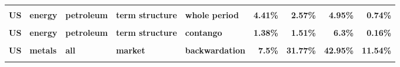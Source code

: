 \documentclass[
  authoryear,
  preprint,
  3p]{elsarticle}
\begin{document}
\begin{landscape}
\begin{longtable}[t]{>{}l>{}l>{}l>{}l>{}l>{}r>{}r>{}r>{}r}
\textbf{\cellcolor{gray!10}{US}} & \textbf{\cellcolor{gray!10}{energy}} & \textbf{\cellcolor{gray!10}{petroleum}} & \textbf{\cellcolor{gray!10}{open interest nearby}} & \textbf{\cellcolor{gray!10}{contango}} & \textcolor[HTML]{4285f4}{\textbf{\cellcolor{gray!10}{47.85\%}}} & \textcolor[HTML]{4285f4}{\textbf{\cellcolor{gray!10}{43.02\%}}} & \textcolor[HTML]{4285f4}{\textbf{\cellcolor{gray!10}{26.44\%}}} & \textcolor[HTML]{4285f4}{\textbf{\cellcolor{gray!10}{37.7\%}}}\\
\addlinespace
\textbf{US} & \textbf{energy} & \textbf{petroleum} & \textbf{term structure} & \textbf{whole period} & \textcolor[HTML]{4285f4}{\textbf{4.41\%}} & \textcolor[HTML]{4285f4}{\textbf{2.57\%}} & \textcolor[HTML]{4285f4}{\textbf{4.95\%}} & \textcolor[HTML]{4285f4}{\textbf{0.74\%}}\\
\textbf{\cellcolor{gray!10}{US}} & \textbf{\cellcolor{gray!10}{energy}} & \textbf{\cellcolor{gray!10}{petroleum}} & \textbf{\cellcolor{gray!10}{term structure}} & \textbf{\cellcolor{gray!10}{backwardation}} & \textcolor[HTML]{4285f4}{\textbf{\cellcolor{gray!10}{9.74\%}}} & \textcolor[HTML]{4285f4}{\textbf{\cellcolor{gray!10}{4.32\%}}} & \textcolor[HTML]{4285f4}{\textbf{\cellcolor{gray!10}{2.68\%}}} & \textcolor[HTML]{4285f4}{\textbf{\cellcolor{gray!10}{2.56\%}}}\\
\textbf{US} & \textbf{energy} & \textbf{petroleum} & \textbf{term structure} & \textbf{contango} & \textcolor[HTML]{4285f4}{\textbf{1.38\%}} & \textcolor[HTML]{4285f4}{\textbf{1.51\%}} & \textcolor[HTML]{4285f4}{\textbf{6.3\%}} & \textcolor[HTML]{4285f4}{\textbf{0.16\%}}\\
\textbf{\cellcolor{gray!10}{US}} & \textbf{\cellcolor{gray!10}{metals}} & \textbf{\cellcolor{gray!10}{all}} & \textbf{\cellcolor{gray!10}{market}} & \textbf{\cellcolor{gray!10}{whole period}} & \textcolor[HTML]{4285f4}{\textbf{\cellcolor{gray!10}{7.54\%}}} & \textcolor[HTML]{4285f4}{\textbf{\cellcolor{gray!10}{30.79\%}}} & \textcolor[HTML]{4285f4}{\textbf{\cellcolor{gray!10}{38.2\%}}} & \textcolor[HTML]{4285f4}{\textbf{\cellcolor{gray!10}{18.58\%}}}\\
\textbf{US} & \textbf{metals} & \textbf{all} & \textbf{market} & \textbf{backwardation} & \textcolor[HTML]{4285f4}{\textbf{7.5\%}} & \textcolor[HTML]{4285f4}{\textbf{31.77\%}} & \textcolor[HTML]{4285f4}{\textbf{42.95\%}} & \textcolor[HTML]{4285f4}{\textbf{11.54\%}}\\
\addlinespace
\textbf{\cellcolor{gray!10}{US}} & \textbf{\cellcolor{gray!10}{metals}} & \textbf{\cellcolor{gray!10}{all}} & \textbf{\cellcolor{gray!10}{market}} & \textbf{\cellcolor{gray!10}{contango}} & \textcolor[HTML]{4285f4}{\textbf{\cellcolor{gray!10}{7.63\%}}} & \textcolor[HTML]{4285f4}{\textbf{\cellcolor{gray!10}{30.19\%}}} & \textcolor[HTML]{4285f4}{\textbf{\cellcolor{gray!10}{36.15\%}}} & \textcolor[HTML]{4285f4}{\textbf{\cellcolor{gray!10}{23\%}}}\\

\end{longtable}
\end{landscape}
\end{document}
